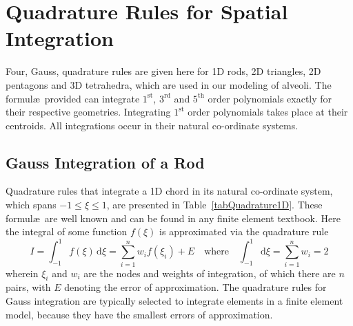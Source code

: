 \section{Quadrature Rules for Spatial Integration}
\label{secGauss}

Four, Gauss, quadrature rules are given here for 1D rods, 2D triangles, 2D pentagons and 3D tetrahedra, which are used in our modeling of alveoli.  The formul\ae\ provided can integrate $1^{\text{st}}$, $3^{\text{rd}}$ and $5^{\text{th}}$ order polynomials exactly for their respective geometries.  Integrating $1^{\text{st}}$ order polynomials takes place at their centroids.  All integrations occur in their natural co-ordinate systems.

\subsection{Gauss Integration of a Rod}

Quadrature rules that integrate a 1D chord in its natural co-ordinate system, which spans $-1 \leq \xi \leq 1$, are presented in Table~\ref{tabQuadrature1D}.  These formul\ae\ are well known and can be found in any finite element textbook.  Here the integral of some function $f( \xi )$ is approximated via the quadrature rule
\begin{equation}
    I = \int_{-1}^1 f ( \xi ) \, \mathrm{d} \xi 
    = \sum_{i=1}^n w_i f( \xi_i ) + E
    \quad \text{where} \quad
    \int_{-1}^1 \mathrm{d} \xi = \sum_{i=1}^n w_i = 2
    \label{Gauss1D}
\end{equation}
wherein $\xi_i$ and $w_i$ are the nodes and weights of integration, of which there are $n$ pairs, with $E$ denoting the error of approximation.  The quadrature rules for Gauss integration are typically selected to integrate elements in a finite element model, because they have the smallest errors of approximation.

